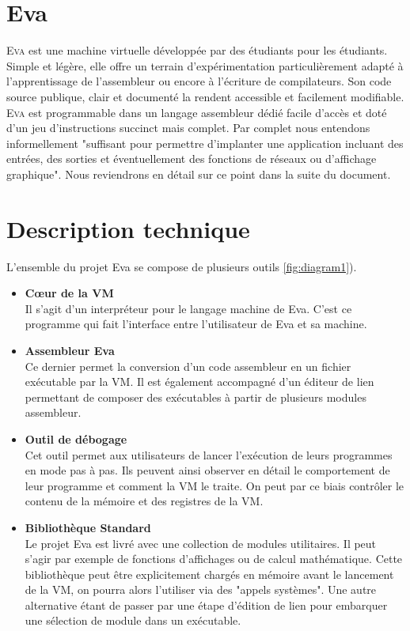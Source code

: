 \documentclass[11pt,twoside,french]{article}
\newcommand{\noun}[1]{\textsc{#1}}
\begin{document}
\vfill{}
\newpage{}

\section{Eva}

\noun{Eva} est une machine virtuelle développée par des étudiants pour les
étudiants. Simple et légère, elle offre un terrain d'expérimentation
particulièrement adapté à l'apprentissage de l'assembleur ou encore
à l'écriture de compilateurs. Son code source publique, clair et documenté
la rendent accessible et facilement modifiable. \noun{Eva} est programmable
dans un langage assembleur dédié facile d'accès et doté d'un jeu d'instructions
succinct mais complet. Par complet nous entendons informellement "suffisant pour permettre d'implanter une application incluant des entrées, des sorties et éventuellement des fonctions de réseaux ou d'affichage graphique". Nous reviendrons en détail sur ce point dans la suite du document.

\vfill{}

\section{Description technique}

L'ensemble du projet Eva se compose de plusieurs outils \ref{fig:diagram1}).

\begin{itemize}
  \item \textbf{Cœur de la VM} \\
  Il s'agit d'un interpréteur pour le langage machine de Eva. C'est ce programme qui fait l'interface entre l'utilisateur de Eva et sa machine.

  \item \textbf{Assembleur Eva} \\
  Ce dernier permet la conversion d'un code assembleur en un fichier exécutable par la VM. Il est également accompagné d'un éditeur de lien permettant de composer des exécutables à partir de plusieurs modules assembleur.

  \item \textbf{Outil de débogage} \\
  Cet outil permet aux utilisateurs de lancer l’exécution de leurs programmes en mode pas à pas. Ils peuvent ainsi observer en détail le comportement de leur programme et comment la VM le traite. On peut par ce biais contrôler le contenu de la mémoire et des registres de la VM.


  \item \textbf{Bibliothèque Standard} \\
  Le projet Eva est livré avec une collection de modules utilitaires. Il peut s'agir par exemple de fonctions d'affichages ou de calcul mathématique. Cette bibliothèque peut être explicitement chargés en mémoire avant le lancement de la VM, on pourra alors l'utiliser via des "appels systèmes". Une autre alternative étant de passer par une étape d'édition de lien pour embarquer une sélection de module dans un exécutable.

\end{itemize}
\end{document}
